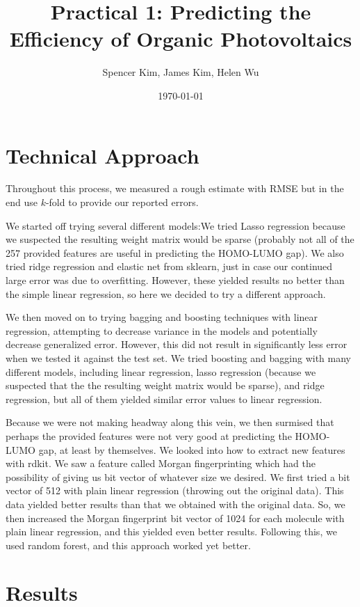 \documentclass[11pt]{article}
\title{Practical 1: Predicting the Efficiency of Organic Photovoltaics}
\author{Spencer Kim, James Kim, Helen Wu}
\date{\today}
\begin{document}
\maketitle
\section{Technical Approach}
Throughout this process, we measured a rough estimate with RMSE but in the end use $k$-fold to provide our reported errors. 

We started off trying several different models:We tried Lasso regression because we suspected the resulting weight matrix would be sparse (probably not all of the 257 provided features are useful in predicting the HOMO-LUMO gap). We also tried ridge regression and elastic net from sklearn, just in case our continued large error was due to overfitting. However, these yielded results no better than the simple linear regression, so here we decided to try a different approach.

We then moved on to trying bagging and boosting techniques with linear regression, attempting to decrease variance in the models and potentially decrease generalized error. However, this did not result in significantly less error when we tested it against the test set. We tried boosting and bagging with many different models, including linear regression, lasso regression (because we suspected that the the resulting weight matrix would be sparse), and ridge regression, but all of them yielded similar error values to linear regression.

Because we were not making headway along this vein, we then surmised that perhaps the provided features were not very good at predicting the HOMO-LUMO gap, at least by themselves. We looked into how to extract new features with rdkit. We saw a feature called Morgan fingerprinting which had the possibility of giving us bit vector of whatever size we desired. We first tried a bit vector of 512 with plain linear regression (throwing out the original data). This data yielded better results than that we obtained with the original data. So, we then increased the Morgan fingerprint bit vector of 1024 for each molecule with plain linear regression, and this yielded even better results. Following this, we used random forest, and this approach worked yet better.

\section{Results}
\end{document}
